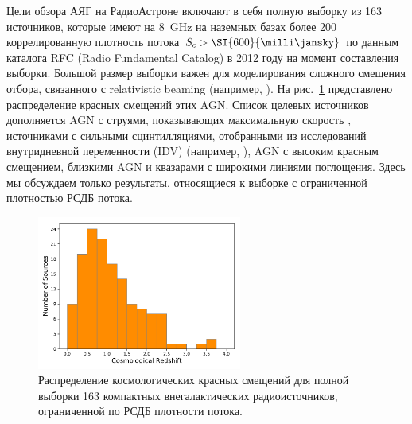 Цели обзора АЯГ на РадиоАстроне включают в себя полную выборку из 163 источников, которые имеют на
\SI{8}{\GHz} на наземных базах более \SI{200}{\mega\la} коррелированную плотность потока $S_c >
\SI{600}{\milli\jansky}$ по данным каталога RFC (Radio Fundamental Catalog) в 2012 году на момент
составления выборки. Большой размер выборки важен для моделирования сложного смещения отбора,
связанного с relativistic beaming (например, \cite{Lister_2003}). На рис.~\ref{fig:RAsurvey_z}
представлено распределение красных смещений этих AGN. Список целевых источников дополняется AGN с
струями, показывающих максимальную скорость \cite{Lister_2016}, источниками с сильными
сцинтилляциями, отобранными из исследований внутридневной переменности (IDV) (например,
\cite{Lovell_2008}), AGN с высоким красным смещением, близкими AGN и квазарами с широкими линиями
поглощения. Здесь мы обсуждаем только результаты, относящиеся к выборке с ограниченной плотностью
РСДБ потока.

\begin{figure}[tbh]
\centering
\includegraphics[width=0.6\textwidth,trim=0cm 0.5cm 0cm 0cm]{RAsurvey_redshift_hist.pdf}
\caption{Распределение космологических красных смещений для полной выборки 163 компактных
внегалактических радиоисточников, ограниченной по РСДБ плотности потока.
\label{fig:RAsurvey_z}
}
\end{figure}

